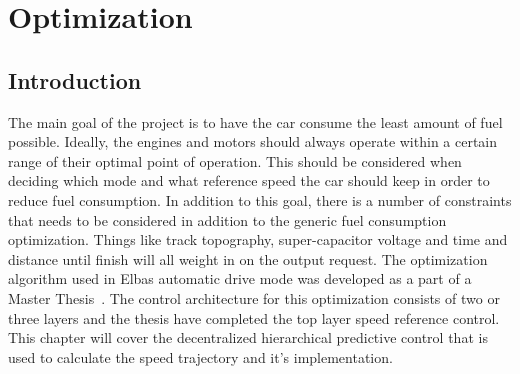 \chapter{Optimization}

\section{Introduction}
The main goal of the project is to have the car consume the least amount of fuel
possible. Ideally, the engines and motors should always
operate within a certain range of their optimal point of operation. This should be considered when deciding which mode and what reference speed the car should keep in order to reduce
fuel consumption. In addition to this goal, there is a number of constraints
that needs to be considered in addition to the generic fuel consumption
optimization. Things like track topography, super-capacitor voltage and time and distance until finish will all weight in on the output request. The
optimization algorithm used in Elbas automatic drive mode was developed as a
part of a Master Thesis~\cite{liu2016}. The control architecture for this
optimization consists of two or three layers and the thesis have completed the
top layer speed reference control. This chapter will cover the decentralized
hierarchical predictive control that is used to calculate the speed trajectory
and it's implementation.

